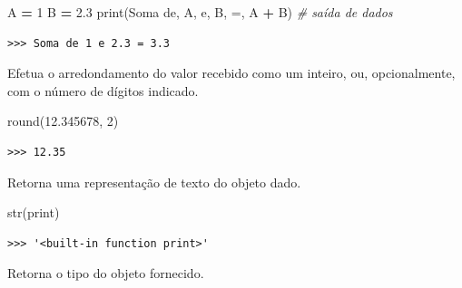 \documentclass[
]{book}
\newenvironment{Shaded}{\begin{snugshade}}{\end{snugshade}}
\newcommand{\BuiltInTok}[1]{#1}
\newcommand{\CommentTok}[1]{\textcolor[rgb]{0.56,0.35,0.01}{\textit{#1}}}
\newcommand{\DecValTok}[1]{\textcolor[rgb]{0.00,0.00,0.81}{#1}}
\newcommand{\FloatTok}[1]{\textcolor[rgb]{0.00,0.00,0.81}{#1}}
\newcommand{\NormalTok}[1]{#1}
\newcommand{\OperatorTok}[1]{\textcolor[rgb]{0.81,0.36,0.00}{\textbf{#1}}}
\newcommand{\StringTok}[1]{\textcolor[rgb]{0.31,0.60,0.02}{#1}}
\providecommand{\tightlist}{%
  \setlength{\itemsep}{0pt}\setlength{\parskip}{0pt}}
\begin{document}
\begin{Shaded}
\begin{Highlighting}[]
\NormalTok{A }\OperatorTok{=} \DecValTok{1}
\NormalTok{B }\OperatorTok{=} \FloatTok{2.3}
\BuiltInTok{print}\NormalTok{(}\StringTok{\textquotesingle{}Soma de\textquotesingle{}}\NormalTok{, A, }\StringTok{\textquotesingle{}e\textquotesingle{}}\NormalTok{, B, }\StringTok{\textquotesingle{}=\textquotesingle{}}\NormalTok{, A }\OperatorTok{+}\NormalTok{ B) }\CommentTok{\# saída de dados}
\end{Highlighting}
\end{Shaded}

\begin{verbatim}
>>> Soma de 1 e 2.3 = 3.3
\end{verbatim}

\begin{description}
\tightlist
\item[\texttt{round(x,\ {[}digitos{]})}]
Efetua o arredondamento do valor recebido como um inteiro, ou, opcionalmente, com o número de dígitos indicado.
\end{description}

\begin{Shaded}
\begin{Highlighting}[]
\BuiltInTok{round}\NormalTok{(}\FloatTok{12.345678}\NormalTok{, }\DecValTok{2}\NormalTok{)}
\end{Highlighting}
\end{Shaded}

\begin{verbatim}
>>> 12.35
\end{verbatim}

\begin{description}
\tightlist
\item[\texttt{str(objeto)}]
Retorna uma representação de texto do objeto dado.
\end{description}

\begin{Shaded}
\begin{Highlighting}[]
\BuiltInTok{str}\NormalTok{(}\BuiltInTok{print}\NormalTok{)}
\end{Highlighting}
\end{Shaded}

\begin{verbatim}
>>> '<built-in function print>'
\end{verbatim}

\begin{description}
\tightlist
\item[\texttt{type(objeto)}]
Retorna o tipo do objeto fornecido.
\end{description}
\end{document}
